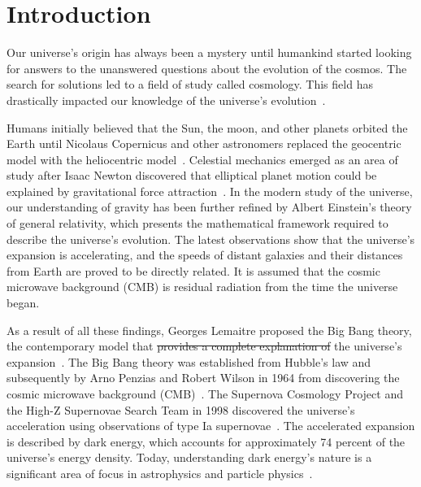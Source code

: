\chapter{Introduction}

Our universe's origin has always been a mystery until humankind started looking for answers to the unanswered questions about the evolution of the cosmos. The search for solutions led to a field of study called cosmology. This field has drastically impacted our knowledge of the universe's evolution~\citep{book:909085}.

Humans initially believed that the Sun, the moon, and other planets orbited the Earth until Nicolaus Copernicus and other astronomers replaced the geocentric model with the heliocentric model~\citep{sep-copernicus, kanas}.  Celestial mechanics emerged as an area of study after Isaac Newton discovered that elliptical planet motion could be explained by gravitational force attraction~\citep{crowe2013theories,sep-copernicus}. In the modern study of the universe, our understanding of gravity has been further refined by Albert Einstein's theory of general relativity, which presents the mathematical framework required to describe the universe's evolution. The latest observations show that the universe's expansion is accelerating, and the speeds of distant galaxies and their distances from Earth are proved to be directly related. It is assumed that the cosmic microwave background (CMB) is residual radiation from the time the universe began. 

As a result of all these findings, Georges Lemaitre proposed the Big Bang theory, the contemporary model that \st{provides a complete explanation of}  the universe's expansion~\citep{1926ApJ....64..321H}. The Big Bang theory was established from Hubble's law and subsequently by Arno Penzias and Robert Wilson in 1964 from discovering the cosmic microwave background (CMB)~\citep{1965ApJ...142..419P, 2003RvMP...75..559P, 1929PNAS...15..168H}. The Supernova Cosmology Project and the High-Z Supernovae Search Team in 1998 discovered the universe's acceleration using observations of type Ia supernovae~\citep{1998AJ....116.1009R, 1999ApJ...517..565P}. The accelerated expansion is described by dark energy, which accounts for approximately 74 percent of the universe's energy density. Today, understanding dark energy's nature is a significant area of focus in astrophysics and particle physics~\citep{2008ARA&A..46..385F}. 

